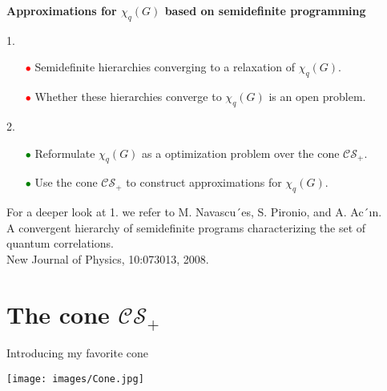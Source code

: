 \documentclass[13.5pt]{beamer}
\begin{document}
\begin{frame}
\begin{center}
{\color{colorblue}\textbf{Approximations for $\chi_q (G)$ based on semidefinite programming}}
\end{center}

\begin{minipage}[t]{150pt}
\pause
\begin{center}
1.
\end{center}
\begin{itemize}
\item[\textcolor{red}{$\bullet$}] Semidefinite hierarchies converging to a relaxation of $\chi_q(G)$.
\item[\textcolor{red}{$\bullet$}] Whether these hierarchies converge to $\chi_q(G)$ is an open problem. 
\end{itemize}
\end{minipage}
\hfill
\begin{minipage}[t]{150pt}
\pause
\begin{center}
2.
\end{center}
\begin{itemize}
\item[\textcolor{green}{$\bullet$}] Reformulate $\chi_q(G)$ as a optimization problem over the cone $\mathcal{CS}_+$. \item[\textcolor{green}{$\bullet$}] Use the cone $\mathcal{CS}_+$ to construct approximations for $\chi_q(G)$.
\end{itemize}
\end{minipage}
\vspace*{2mm}

\begin{scriptsize}
For a deeper look at 1. we refer to M. Navascu´es, S. Pironio, and A. Ac´ın. \\
A convergent hierarchy of semidefinite programs
characterizing the set of quantum correlations.\\
New Journal of Physics, 10:073013, 2008.
\end{scriptsize}
\end{frame}


\section{The cone $\mathcal{CS}_+$}
\begin{frame}{Introducing my favorite cone}
\begin{center}
\texttt{[image: images/Cone.jpg]}
\end{center}
\end{frame}
\end{document}
